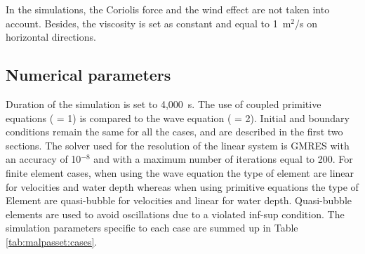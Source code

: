 In the simulations, the Coriolis force and the wind effect are not taken into
account.
Besides, the viscosity is set as constant and equal to 1~m$^2$/s on horizontal
directions.

\subsection{Numerical parameters}
\label{subsection:malpasset:cases}
Duration of the simulation is set to 4,000~s.
The use of coupled primitive equations
( = 1)
is compared to the wave equation ( = 2).
Initial and boundary conditions remain the same for all the cases, and are
described in the first two sections.
The solver used for the resolution of the linear system is GMRES with an
accuracy of 10$^{-8}$ and with a maximum number of iterations equal to 200.
For finite element cases, when using the wave equation the type of element are
linear for velocities and water depth whereas when using primitive equations the
type of Element are quasi-bubble for velocities and linear for water depth.
Quasi-bubble elements are used to avoid oscillations due to a violated inf-sup
condition.
The simulation parameters specific to each case are summed up in Table
\ref{tab:malpasset:cases}.
\begin{table}[H]
  \caption{List of the simulation parameters used for the different cases tested}
  \label{tab:malpasset:cases}
\end{table}

